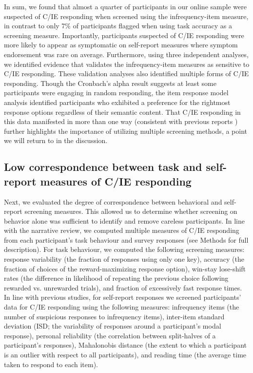 \documentclass[a4paper,notitlepage,12pt]{article}
\begin{document}
In sum, we found that almost a quarter of participants in our online sample were suspected of C/IE responding when screened using the infrequency-item measure, in contrast to only 7\% of participants flagged when using task accuracy as a screening measure. Importantly, participants suspected of C/IE responding were more likely to appear as symptomatic on self-report measures where symptom endorsement was rare on average. Furthermore, using three independent analyses, we identified evidence that validates the infrequency-item measures as sensitive to C/IE responding. These validation analyses also identified multiple forms of C/IE responding. Though the Cronbach's alpha result suggests at least some participants were engaging in random responding, the item response model analysis identified participants who exhibited a preference for the rightmost response options regardless of their semantic content. That C/IE responding in this data manifested in more than one way (consistent with previous reports \cite{curran2016methods}) further highlights the importance of utilizing multiple screening methods, a point we will return to in the discussion.

\subsection{Low correspondence between task and self-report measures of C/IE responding}

Next, we evaluated the degree of correspondence between behavioral and self-report screening measures. This allowed us to determine whether screening on behavior alone was sufficient to identify and remove careless participants. In line with the narrative review, we computed multiple measures of C/IE responding from each participant's task behaviour and survey responses (see Methods for full description). For task behaviour, we computed the following screening measures: response variability (the fraction of responses using only one key), accuracy (the fraction of choices of the reward-maximizing response option), win-stay lose-shift rates (the difference in likelihood of repeating the previous choice following rewarded vs. unrewarded trials), and fraction of excessively fast response times. In line with previous studies, for self-report responses we screened participants' data for C/IE responding using the following measures: infrequency items (the number of suspicious responses to infrequency items), inter-item standard deviation (ISD; the variability of responses around a participant's modal response), personal reliability (the correlation between split-halves of a participant's responses), Mahalonobis distance (the extent to which a participant is an outlier with respect to all participants), and reading time (the average time taken to respond to each item). 
\end{document}
